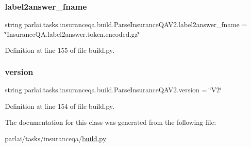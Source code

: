 \subsubsection{\texorpdfstring{label2answer\+\_\+fname}{label2answer\_fname}}
{\footnotesize\ttfamily string parlai.\+tasks.\+insuranceqa.\+build.\+Parse\+Insurance\+Q\+A\+V2.\+label2answer\+\_\+fname = \char`\"{}Insurance\+Q\+A.\+label2answer.\+token.\+encoded.\+gz\char`\"{}\hspace{0.3cm}{\ttfamily [static]}}



Definition at line 155 of file build.\+py.

\mbox{\label{classparlai_1_1tasks_1_1insuranceqa_1_1build_1_1ParseInsuranceQAV2_a3e6db8ab79db9655ff077b13b84d1c1b}} 
\subsubsection{\texorpdfstring{version}{version}}
{\footnotesize\ttfamily string parlai.\+tasks.\+insuranceqa.\+build.\+Parse\+Insurance\+Q\+A\+V2.\+version = \char`\"{}V2\char`\"{}\hspace{0.3cm}{\ttfamily [static]}}



Definition at line 154 of file build.\+py.



The documentation for this class was generated from the following file\+:\begin{DoxyCompactItemize}
\item 
parlai/tasks/insuranceqa/\hyperlink{parlai_2tasks_2insuranceqa_2build_8py}{build.\+py}\end{DoxyCompactItemize}
